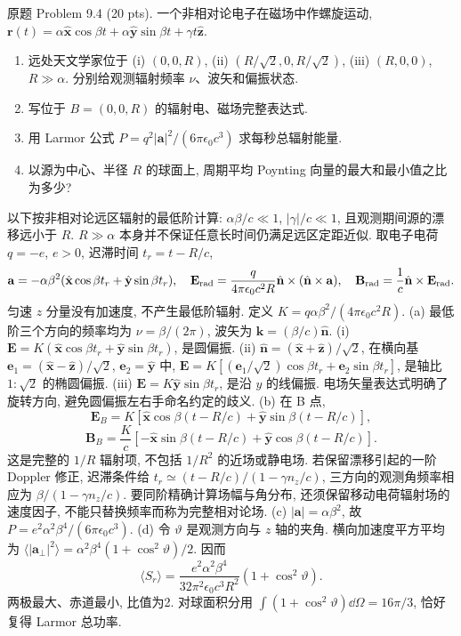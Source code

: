 \begin{exercise}\label{ps:9.4}
原题 Problem 9.4 (20 pts). 一个非相对论电子在磁场中作螺旋运动,
$\mathbf r(t)=\alpha\hat{\mathbf x}\cos\beta t+\alpha\hat{\mathbf y}\sin\beta t+\gamma t\hat{\mathbf z}$.
\begin{enumerate}[label=\alph*.]
\item 远处天文学家位于 (i) $(0,0,R)$, (ii) $(R/\sqrt2,0,R/\sqrt2)$, (iii) $(R,0,0)$, $R\gg\alpha$. 分别给观测辐射频率 $\nu$、波矢和偏振状态.
\item 写位于 $B=(0,0,R)$ 的辐射电、磁场完整表达式.
\item 用 Larmor 公式 $P=q^2|\mathbf a|^2/(6\pi\epsilon_0c^3)$ 求每秒总辐射能量.
\item 以源为中心、半径 $R$ 的球面上, 周期平均 Poynting 向量的最大和最小值之比为多少?
\end{enumerate}
\end{exercise}
\begin{solution}
以下按非相对论远区辐射的最低阶计算: $\alpha\beta/c\ll1$, $|\gamma|/c\ll1$, 且观测期间源的漂移远小于 $R$. $R\gg\alpha$ 本身并不保证任意长时间仍满足远区定距近似. 取电子电荷 $q=-e$, $e>0$, 迟滞时间 $t_r=t-R/c$,
\[
\mathbf a=-\alpha\beta^2(\hat{\mathbf x}\cos\beta t_r+\hat{\mathbf y}\sin\beta t_r),\quad
\mathbf E_{\rm rad}=\frac{q}{4\pi\epsilon_0c^2R}\hat{\mathbf n}\times(\hat{\mathbf n}\times\mathbf a),\quad
\mathbf B_{\rm rad}=\frac1c\hat{\mathbf n}\times\mathbf E_{\rm rad}.
\]
匀速 $z$ 分量没有加速度, 不产生最低阶辐射. 定义 $K=q\alpha\beta^2/(4\pi\epsilon_0c^2R)$.
(a) 最低阶三个方向的频率均为 $\nu=\beta/(2\pi)$, 波矢为 $\mathbf k=(\beta/c)\hat{\mathbf n}$.
(i) $\mathbf E=K(\hat{\mathbf x}\cos\beta t_r+\hat{\mathbf y}\sin\beta t_r)$, 是圆偏振. (ii) $\hat{\mathbf n}=(\hat{\mathbf x}+\hat{\mathbf z})/\sqrt2$, 在横向基 $\mathbf e_1=(\hat{\mathbf x}-\hat{\mathbf z})/\sqrt2$, $\mathbf e_2=\hat{\mathbf y}$ 中,
$\mathbf E=K[(\mathbf e_1/\sqrt2)\cos\beta t_r+\mathbf e_2\sin\beta t_r]$, 是轴比 $1:\sqrt2$ 的椭圆偏振. (iii) $\mathbf E=K\hat{\mathbf y}\sin\beta t_r$, 是沿 $y$ 的线偏振. 电场矢量表达式明确了旋转方向, 避免圆偏振左右手命名约定的歧义.
(b) 在 B 点,
\[
\mathbf E_B=K[\hat{\mathbf x}\cos\beta(t-R/c)+\hat{\mathbf y}\sin\beta(t-R/c)],
\]
\[
\mathbf B_B=\frac Kc[-\hat{\mathbf x}\sin\beta(t-R/c)+\hat{\mathbf y}\cos\beta(t-R/c)].
\]
这是完整的 $1/R$ 辐射项, 不包括 $1/R^2$ 的近场或静电场. 若保留漂移引起的一阶 Doppler 修正, 迟滞条件给 $t_r\simeq(t-R/c)/(1-\gamma n_z/c)$, 三方向的观测角频率相应为 $\beta/(1-\gamma n_z/c)$. 要同阶精确计算场幅与角分布, 还须保留移动电荷辐射场的速度因子, 不能只替换频率而称为完整相对论场.
(c) $|\mathbf a|=\alpha\beta^2$, 故 $P=e^2\alpha^2\beta^4/(6\pi\epsilon_0c^3)$.
(d) 令 $\vartheta$ 是观测方向与 $z$ 轴的夹角. 横向加速度平方平均为
$\langle|\mathbf a_\perp|^2\rangle=\alpha^2\beta^4(1+\cos^2\vartheta)/2$. 因而
\[
\langle S_r\rangle=\frac{e^2\alpha^2\beta^4}{32\pi^2\epsilon_0c^3R^2}(1+\cos^2\vartheta).
\]
两极最大、赤道最小, 比值为2. 对球面积分用 $\int(1+\cos^2\vartheta)\dd\Omega=16\pi/3$, 恰好复得 Larmor 总功率.
\end{solution}

